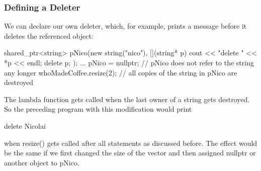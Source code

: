 \documentclass{report}
\begin{document}
\subsubsection{Defining a Deleter}
\bigbreak \noindent 
We can declare our own deleter, which, for example, prints a message before it deletes the referenced object:
\bigbreak \noindent 
\begin{cppcode}
    shared_ptr<string> pNico(new string("nico"),
    [](string* p) {
        cout << "delete " << *p << endl;
        delete p;
    });
    ...
    pNico = nullptr; // pNico does not refer to the string any longer
    whoMadeCoffee.resize(2); // all copies of the string in pNico are destroyed
\end{cppcode}
\bigbreak \noindent 
The lambda function gets called when the last owner of a string gets destroyed. So the preceding program with this modification would print
\bigbreak \noindent 
\begin{cppcode}
delete Nicolai
\end{cppcode}
\bigbreak \noindent 
when resize() gets called after all statements as discussed before. The effect would be the same if we first changed the size of the vector and then assigned nullptr or another object to pNico.
\bigbreak \noindent 
\end{document}
